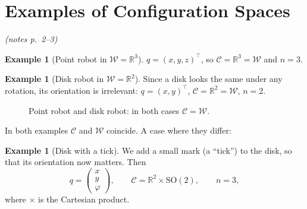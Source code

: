 \documentclass[11pt,a4paper]{article}
\newcommand{\R}{\mathbb{R}}
\newcommand{\W}{\mathcal{W}}
\newcommand{\C}{\mathcal{C}}
\newcommand{\SO}{\mathrm{SO}}
\newcommand{\pts}[1]{\emph{(notes p.~#1)}}
\theoremstyle{definition}
\newtheorem{example}[definition]{Example}
\theoremstyle{plain}
\theoremstyle{remark}
\begin{document}
\section{Examples of Configuration Spaces}\pts{2--3}

\begin{example}[Point robot in $\W=\R^3$]
$q=(x,y,z)^\top$, so $\C=\R^3=\W$ and $n=3$.
\end{example}

\begin{example}[Disk robot in $\W=\R^2$]
Since a disk looks the same under any rotation, its orientation is irrelevant: $q=(x,y)^\top$, $\C=\R^2=\W$, $n=2$.
\end{example}

\begin{figure}[ht]
\centering
{}
\caption{Point robot and disk robot: in both cases $\C=\W$.}
\end{figure}

In both examples $\C$ and $\W$ coincide. A case where they differ:

\begin{example}[Disk with a tick]
We add a small mark (a ``tick'') to the disk, so that its orientation now matters. Then
\[
  q=\begin{pmatrix}x\\y\\\varphi\end{pmatrix},\qquad
  \C=\R^2\times \SO(2),\qquad n=3 ,
\]
where $\times$ is the Cartesian product.
\end{example}
\end{document}
